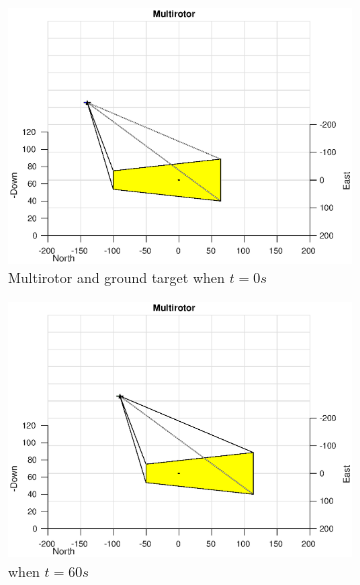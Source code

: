 \begin{figure}
	\centering
	\begin{subfigure}[b]{0.45\linewidth}
		\includegraphics[width=\textwidth]{images/chapter4/inertial_UAV_0mps}
		\caption{Multirotor and ground target when $t=0s$}
	\end{subfigure}
	\begin{subfigure}[b]{0.45\linewidth}
		\includegraphics[width=\textwidth]{images/chapter4/inertial_UAV_0mps_60s}
		\caption{when $t=60s$}
	\end{subfigure}
	\begin{subfigure}[b]{0.45\linewidth}

\end{subfigure}
\end{figure}
